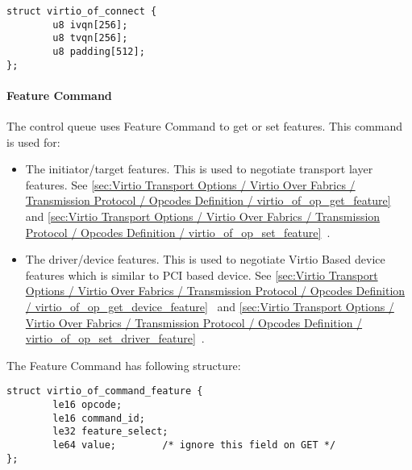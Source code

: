 \begin{lstlisting}
struct virtio_of_connect {
        u8 ivqn[256];
        u8 tvqn[256];
        u8 padding[512];
};
\end{lstlisting}

\paragraph{Feature Command}\label{sec:Virtio Transport Options / Virtio Over Fabrics / Transmission Protocol / Commands Definition / Feature Command}

The control queue uses Feature Command to get or set features. This command is used for:

\begin{itemize}
\item The initiator/target features. This is used to negotiate transport layer features. See \ref{sec:Virtio Transport Options / Virtio Over Fabrics / Transmission Protocol / Opcodes Definition / virtio_of_op_get_feature}~ and \ref{sec:Virtio Transport Options / Virtio Over Fabrics / Transmission Protocol / Opcodes Definition / virtio_of_op_set_feature}~.
\item The driver/device features. This is used to negotiate Virtio Based device features which is similar to PCI based device. See \ref{sec:Virtio Transport Options / Virtio Over Fabrics / Transmission Protocol / Opcodes Definition / virtio_of_op_get_device_feature}~ and \ref{sec:Virtio Transport Options / Virtio Over Fabrics / Transmission Protocol / Opcodes Definition / virtio_of_op_set_driver_feature}~.
\end{itemize}

The Feature Command has following structure:

\begin{lstlisting}
struct virtio_of_command_feature {
        le16 opcode;
        le16 command_id;
        le32 feature_select;
        le64 value;        /* ignore this field on GET */
};
\end{lstlisting}

